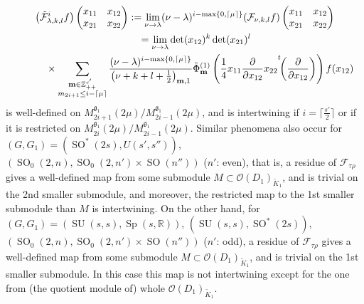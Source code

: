 \documentclass[pdftex]{sigma}
\numberwithin{equation}{section}
\newcommand{\bm}{\mathbf{m}}
\newcommand{\BZ}{\mathbb{Z}}
\newcommand{\BR}{\mathbb{R}}
\newcommand{\fg}{\mathfrak{g}}
\newcommand{\cF}{\mathcal{F}}
\newcommand{\cO}{\mathcal{O}}
\begin{document}
\begin{gather*}
\big(\tilde{\cF}^i_{\lambda,k,l}f\big)\begin{pmatrix}x_{11}&x_{12}\\x_{21}&x_{22}\end{pmatrix}
:=\lim_{\nu\to\lambda}(\nu-\lambda)^{i-\max\{0,\lceil \mu\rceil\}}(\cF_{\nu,k,l}f)\begin{pmatrix}x_{11}&x_{12}\\x_{21}&x_{22}\end{pmatrix}\\
\qquad{} =\lim_{\nu\to\lambda}\det(x_{12})^k\det(x_{21})^l \\
\qquad\quad{} \times \sum_{\substack{\bm\in\BZ_{++}^{s'}\\ m_{2i+1}\le i-\lceil\mu\rceil}}
\frac{(\nu-\lambda)^{i-\max\{0,\lceil \mu\rceil\}}}{\big(\nu+k+l+\frac{1}{2}\big)_{\bm,1}}
\tilde{\Phi}_\bm^{(1)} \left(\frac{1}{4}x_{11}\frac{\partial}{\partial x_{12}}x_{22}{\vphantom{\biggl(}}^t\!\!\left(\frac{\partial}{\partial x_{12}}\right)\right)f(x_{12})
\end{gather*}
is well-defined on $M_{2i+1}^{\fg_1}(2\mu)/M_{2i-1}^{\fg_1}(2\mu)$, and is intertwining if $i=\big\lceil \frac{s'}{2}\big\rceil$ or if it is restricted on $M_{2i}^{\fg_1}(2\mu)/M_{2i-1}^{\fg_1}(2\mu)$.
Similar phenomena also occur for $(G,G_1)=(\operatorname{SO}^*(2s),U(s',s''))$, $(\operatorname{SO}_0(2,n),\operatorname{SO}_0(2,n')\times \operatorname{SO}(n''))$ ($n'$: even), that is, a residue of $\cF_{\tau\rho}$ gives a well-defined map from some submodule $M\subset\cO(D_1)_{\tilde{K}_1}$, and is trivial on the 2nd smaller submodule, and moreover, the restricted map to the 1st smaller submodule than $M$ is intertwining. On the other hand, for $(G,G_1)=(\operatorname{SU}(s,s),\operatorname{Sp}(s,\BR))$, $(\operatorname{SU}(s,s),\operatorname{SO}^*(2s))$, $(\operatorname{SO}_0(2,n),\operatorname{SO}_0(2,n')\times \operatorname{SO}(n''))$ ($n'$: odd), a residue of $\cF_{\tau\rho}$ gives a well-defined map from some submodule $M\subset\cO(D_1)_{\tilde{K}_1}$, and is trivial on the 1st smaller submodule. In this case this map is not intertwining except for the one from (the quotient module of) whole $\cO(D_1)_{\tilde{K}_1}$.
\end{document}
